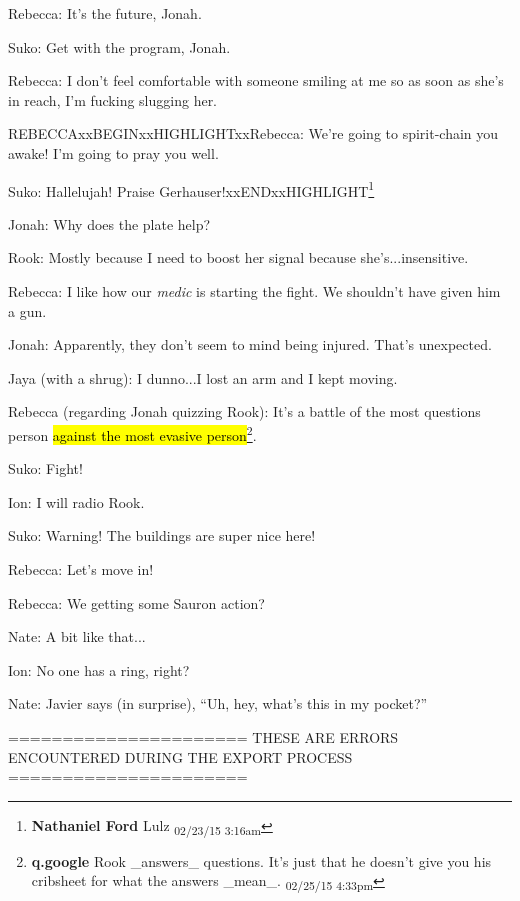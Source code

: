 Rebecca: It's the future, Jonah.

Suko: Get with the program, Jonah.



Rebecca: I don't feel comfortable with someone smiling at me so as soon as she's in reach, I'm fucking slugging her.



REBECCAxxBEGINxxHIGHLIGHTxxRebecca: We're going to spirit-chain you awake!  I'm going to pray you well.

Suko:  Hallelujah!  Praise Gerhauser!xxENDxxHIGHLIGHT\footnote{\textbf{Nathaniel Ford }Lulz \textsubscript{02/23/15 3:16am}}



Jonah: Why does the plate help?

Rook: Mostly because I need to boost her signal because she's...insensitive.



Rebecca: I like how our \textit{medic }is starting the fight.  We shouldn't have given him a gun.



Jonah: Apparently, they don't seem to mind being injured. That's unexpected.

Jaya (with a shrug): I dunno...I lost an arm and I kept moving.



Rebecca (regarding Jonah quizzing Rook): It's a battle of the most questions person \hl{against the most evasive person}\footnote{\textbf{q.google }Rook \_answers\_ questions.  It's just that he doesn't give you his cribsheet for what the answers \_mean\_. \textsubscript{02/25/15 4:33pm}}.

Suko: Fight!



Ion: I will radio Rook.

Suko: Warning!  The buildings are super nice here!

Rebecca: Let's move in!



Rebecca: We getting some Sauron action?

Nate: A bit like that...

Ion: No one has a ring, right?

Nate: Javier says (in surprise), ``Uh, hey, what's this in my pocket?''


\iffalse

======================
THESE ARE ERRORS ENCOUNTERED DURING THE EXPORT PROCESS
======================

